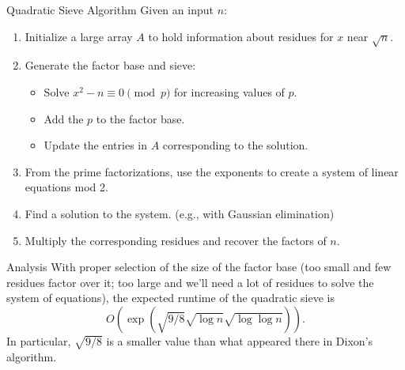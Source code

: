 \documentclass[aspectratio=169]{beamer}
\begin{document}
\begin{frame}{Quadratic Sieve Algorithm}
  Given an input $n$:
  \begin{enumerate}
    \item Initialize a large array $A$ to hold information about
    residues for $x$ near $\sqrt{n}$. \pause
    \item Generate the factor base and sieve: \pause
    \begin{itemize}
      \item Solve $x^2 - n \equiv 0 \pmod{p}$ for increasing values of $p$.
      \item Add the $p$ to the factor base.
      \item Update the entries in $A$ corresponding to the solution.
    \end{itemize} \pause
    \item From the prime factorizations, use the exponents
    to create a system of linear equations mod 2.
    \item Find a solution to the system. (e.g., with Gaussian elimination)
    \item Multiply the corresponding residues and recover the factors of $n$.
  \end{enumerate}
\end{frame}

\begin{frame}{Analysis}
  With proper selection of the size of the factor base
  (too small and few residues factor over it; too large and we'll need a lot
  of residues to solve the system of equations),
  the expected runtime of the quadratic sieve is
  $$O\left(\exp\left(\sqrt{9/8} \sqrt{\log n}\sqrt{\log \log n}\right)\right).$$ \pause
  In particular, $\sqrt{9/8}$ is a smaller value than what appeared there in Dixon's algorithm.
\end{frame}
\end{document}
